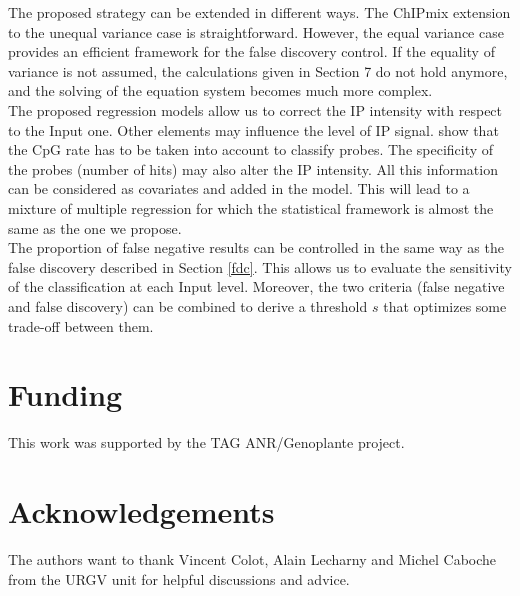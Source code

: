 \documentclass{bioinfo}
\begin{document}
The proposed strategy can be extended in different ways.  The ChIPmix
extension to the unequal variance case is straightforward. However,
the equal variance case provides an efficient framework for the false
discovery control. If the equality of variance is not assumed, the
calculations given in Section 7 do not hold anymore, and the solving
of the equation system becomes much more complex. \\
The proposed regression models allow us to correct the IP
intensity with respect to the Input one. Other elements may influence
the level of IP signal. \cite{Schubeler07} show that the CpG rate has
to be taken into account to classify probes. The specificity of the
probes (number of hits) may also alter the IP intensity. All this
information can be considered as covariates and added in the model.
This will lead to a mixture of multiple regression for which the
statistical framework is almost the same as the one we propose.\\
The proportion of false negative results can be controlled in the same
way as the false discovery described in Section \ref{fdc}. This allows
us to evaluate the sensitivity of the classification at each Input
level. Moreover, the two criteria (false negative and false discovery)
can be combined to derive a threshold $s$ that optimizes some
trade-off between them.

\section{Funding}
This work was supported by the TAG ANR/Genoplante project.

\section{Acknowledgements}
The authors want to thank Vincent Colot, Alain Lecharny and Michel
Caboche from the URGV unit for helpful discussions and advice.
\end{document}
